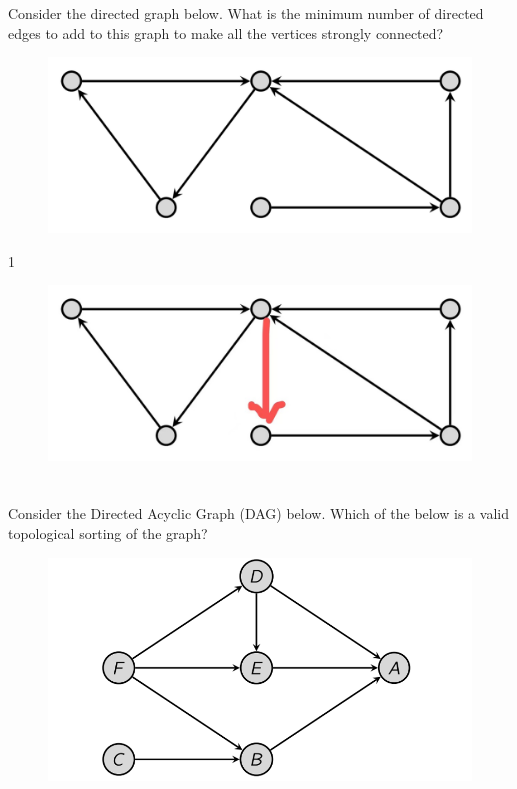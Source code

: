 \documentclass [12pt]{article}
\begin{document}
\section{} Consider the directed graph below. What is the minimum number of directed edges to add to this graph to make all the vertices strongly connected? 
\begin{figure}[H]
    \centering
    \includegraphics[scale=0.5]{2.png} 
    \label{fig:my_label}
\end{figure}

\begin{Solution}
1
\begin{figure}[H]
    \centering
    \includegraphics[scale=0.2]{5.jpeg} 
    \label{fig:my_label}
\end{figure}
\end{Solution}


\section{} Consider the Directed Acyclic Graph (DAG) below. Which of the below is a valid topological sorting of the graph?
\begin{figure}[H]
    \centering
    \includegraphics[scale=0.5]{3.png} 
    \label{fig:my_label}
\end{figure}
\end{document}
